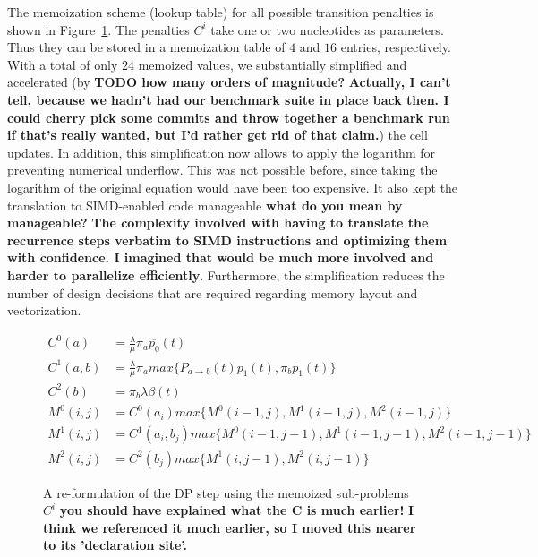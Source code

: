 \documentclass[runningheads,a4paper]{llncs}
\begin{document}
The memoization scheme (lookup table) for all possible transition penalties is shown in Figure~\ref{fig:memo}. 
The penalties $C^i$ take one or two nucleotides as parameters.
Thus they can be stored in a memoization table of $4$ and $16$ entries, respectively. 
With a total of only $24$ memoized values, we substantially simplified and accelerated (by {\bf TODO how many orders of magnitude?} {\bf Actually, I can't tell, because we hadn't had our benchmark suite in place back then. I could cherry pick some commits and throw together a benchmark run if that's really wanted, but I'd rather get rid of that claim.}) the cell updates.
In addition, this simplification now allows to apply the logarithm for preventing numerical underflow.
This was not possible before, since taking the logarithm of the original equation would have been too expensive. 
It also kept the translation to SIMD-enabled code manageable {\bf what do you mean by manageable?} {\bf The complexity involved with having to translate the recurrence steps verbatim to SIMD instructions and optimizing them with confidence. I imagined that would be much more involved and harder to parallelize efficiently}.
Furthermore, the simplification reduces the number of design decisions that are required regarding 
memory layout and vectorization.

\begin{figure}
\[
\begin{aligned}
  C^0(a)&=\frac{\lambda}{\mu}\pi_{a}\overline{p_0}(t)\\
  C^1(a, b)&=\frac{\lambda}{\mu}\pi_{a}max\{P_{a \rightarrow b}(t) p_1(t), \pi_{b}\overline{p_1}(t)\}\\
  C^2(b)&=\pi_{b}\lambda\beta(t)\\
  M^0(i,j)&=C^0(a_i)max\{M^0(i-1, j), M^1(i-1,j), M^2(i-1,j)\}\\
  M^1(i,j)&=C^1(a_i,b_j)max\{M^0(i-1, j-1), M^1(i-1,j-1), M^2(i-1,j-1)\}\\
  M^2(i,j)&=C^2(b_j)max\{M^1(i,j-1), M^2(i,j-1)\}
\end{aligned}
\]
\caption{A re-formulation of the DP step using the memoized sub-problems $C^i$ {\bf you should have explained what the C is much earlier!} {\bf I think we referenced it much earlier, so I moved this nearer to its 'declaration site'.} }
\label{fig:memo}
\end{figure}
\end{document}
